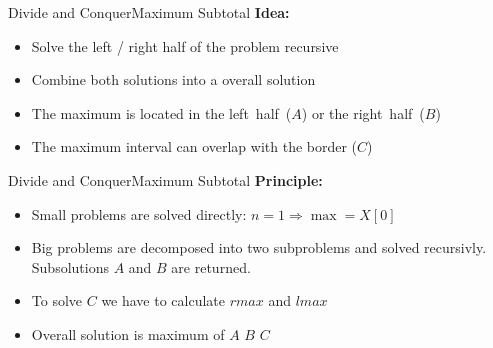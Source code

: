 
\begin{frame}{Divide and Conquer}{Maximum Subtotal}
  \textbf{Idea:}
  \begin{figure}
    \begin{adjustbox}{width=\linewidth}
      
    \end{adjustbox}
    \label{fig:divide_and_conquer:max_sub_total_divide}
  \end{figure}
  \vspace{-1.5em}
  \begin{itemize}
    \item<2->
      Solve the left / right half of the problem {\color{Mittel-Blau}recursive}
    \item<3->
      Combine both solutions into a overall solution
    \item<4->
      The maximum is located in the {\color{Mittel-Blau}left~half~($A$)}
      or the {\color{Mittel-Blau}right~half~($B$)}
    \item<5->
      The maximum interval can {\color{Mittel-Blau} overlap with the border ($C$)}
  \end{itemize}
\end{frame}


\begin{frame}{Divide and Conquer}{Maximum Subtotal}
  \textbf{Principle:}
    \begin{figure}
    \begin{adjustbox}{width=\linewidth}
      
    \end{adjustbox}
    \label{fig:divide_and_conquer:max_sub_total_divide2}
    \end{figure}
    \vspace{-1.5em}
    \begin{itemize}
    \item<2->
    Small problems are solved directly: {\color{Mittel-Blau}$n = 1 \Rightarrow \max = X[0]$}
  \item<3->  
    Big problems are decomposed into two subproblems and solved recursivly.
    Subsolutions {\color{Mittel-Blau}$A$} and  {\color{Mittel-Blau}$B$} are returned.
  \item<4->
    To solve $C$ we have to calculate $rmax$ and $lmax$
  \item<5->
    Overall solution is maximum of {\color{Mittel-Blau}$A$}  {\color{Mittel-Blau}$B$}  {\color{Mittel-Blau}$C$}
  \end{itemize}
\end{frame}

